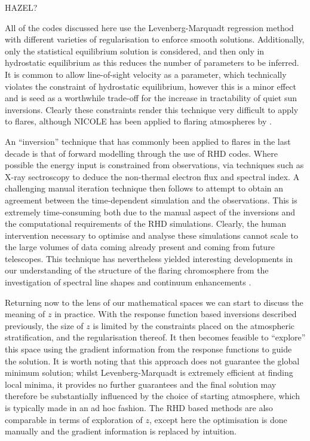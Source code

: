 {\color{Red} HAZEL?}

All of the codes discussed here use the Levenberg-Marquadt regression method with different varieties of regularisation to enforce smooth solutions.
Additionally, only the statistical equilibrium solution is considered, and then only in hydrostatic equilibrium as this reduces the number of parameters to be inferred.
It is common to allow line-of-sight velocity as a parameter, which technically violates the constraint of hydrostatic equilibrium, however this is a minor effect and is seed as a worthwhile trade-off for the increase in tractability of quiet sun inversions.
Clearly these constraints render this technique very difficult to apply to flares, although NICOLE has been applied to flaring atmospheres by \citet{Kuridze2018}.

An ``inversion'' technique that has commonly been applied to flares in the last decade is that of forward modelling through the use of RHD codes.
Where possible the energy input is constrained from observations, via techniques such as X-ray sectroscopy to deduce the non-thermal electron flux and spectral index.
A challenging manual iteration technique then follows to attempt to obtain an agreement between the time-dependent simulation and the observations.
This is extremely time-consuming both due to the manual aspect of the inversions and the computational requirements of the RHD simulations.
Clearly, the human intervention necessary to optimise and analyse these simulations cannot scale to the large volumes of data coming already present and coming from future telescopes.
This technique has nevertheless yielded interesting developments in our understanding of the structure of the flaring chromosphere from the investigation of spectral line shapes and continuum enhancements \citep{Kuridze2015,RubioDaCosta2016, Kowalski2017,Simoes2017}.

Returning now to the lens of our mathematical spaces we can start to discuss the meaning of $z$ in practice.
With the response function based inversions described previously, the size of $z$ is limited by the constraints placed on the atmospheric stratification, and the regularisation thereof.
It then becomes feasible to ``explore'' this space using the gradient information from the response functions to guide the solution.
It is worth noting that this approach does not guarantee the global minimum solution; whilst Levenberg-Marquadt is extremely efficient at finding local minima, it provides no further guarantees and the final solution may therefore be substantially influenced by the choice of starting atmosphere, which is typically made in an ad hoc fashion.
The RHD based methods are also comparable in terms of exploration of $z$, except here the optimisation is done manually and the gradient information is replaced by intuition.

